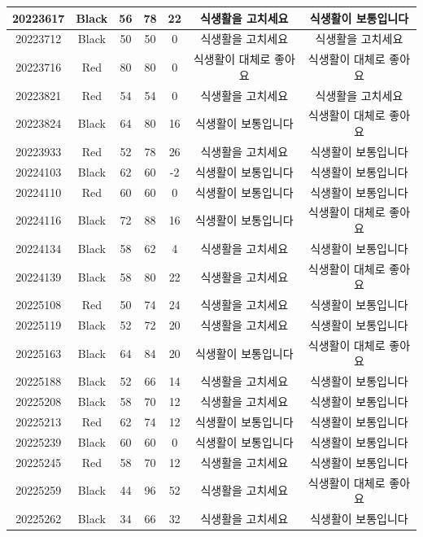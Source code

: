 \documentclass[
]{book}
\begin{document}
\begin{tabular}{c|c|c|c|c|c|c}
\hline
20223617 & Black & 56 & 78 & 22 & 식생활을 고치세요 & 식생활이 보통입니다\\
\hline
20223712 & Black & 50 & 50 & 0 & 식생활을 고치세요 & 식생활을 고치세요\\
\hline
20223716 & Red & 80 & 80 & 0 & 식생활이 대체로 좋아요 & 식생활이 대체로 좋아요\\
\hline
20223821 & Red & 54 & 54 & 0 & 식생활을 고치세요 & 식생활을 고치세요\\
\hline
20223824 & Black & 64 & 80 & 16 & 식생활이 보통입니다 & 식생활이 대체로 좋아요\\
\hline
20223933 & Red & 52 & 78 & 26 & 식생활을 고치세요 & 식생활이 보통입니다\\
\hline
20224103 & Black & 62 & 60 & -2 & 식생활이 보통입니다 & 식생활이 보통입니다\\
\hline
20224110 & Red & 60 & 60 & 0 & 식생활이 보통입니다 & 식생활이 보통입니다\\
\hline
20224116 & Black & 72 & 88 & 16 & 식생활이 보통입니다 & 식생활이 대체로 좋아요\\
\hline
20224134 & Black & 58 & 62 & 4 & 식생활을 고치세요 & 식생활이 보통입니다\\
\hline
20224139 & Black & 58 & 80 & 22 & 식생활을 고치세요 & 식생활이 대체로 좋아요\\
\hline
20225108 & Red & 50 & 74 & 24 & 식생활을 고치세요 & 식생활이 보통입니다\\
\hline
20225119 & Black & 52 & 72 & 20 & 식생활을 고치세요 & 식생활이 보통입니다\\
\hline
20225163 & Black & 64 & 84 & 20 & 식생활이 보통입니다 & 식생활이 대체로 좋아요\\
\hline
20225188 & Black & 52 & 66 & 14 & 식생활을 고치세요 & 식생활이 보통입니다\\
\hline
20225208 & Black & 58 & 70 & 12 & 식생활을 고치세요 & 식생활이 보통입니다\\
\hline
20225213 & Red & 62 & 74 & 12 & 식생활이 보통입니다 & 식생활이 보통입니다\\
\hline
20225239 & Black & 60 & 60 & 0 & 식생활이 보통입니다 & 식생활이 보통입니다\\
\hline
20225245 & Red & 58 & 70 & 12 & 식생활을 고치세요 & 식생활이 보통입니다\\
\hline
20225259 & Black & 44 & 96 & 52 & 식생활을 고치세요 & 식생활이 대체로 좋아요\\
\hline
20225262 & Black & 34 & 66 & 32 & 식생활을 고치세요 & 식생활이 보통입니다\\
\hline

\end{tabular}
\end{document}
